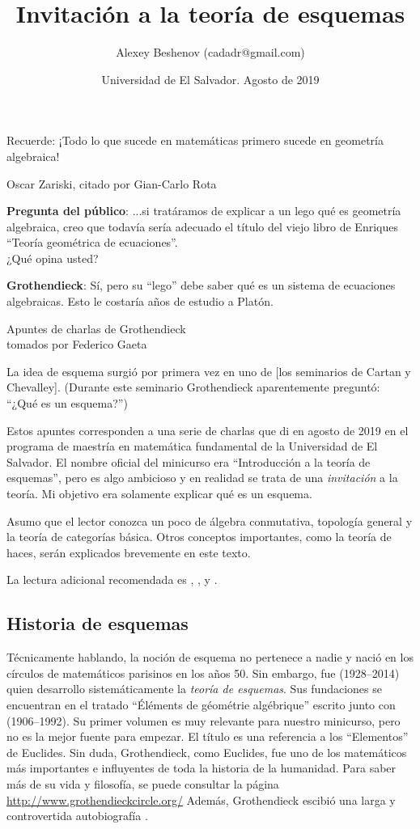 \documentclass{article}
\author{Alexey Beshenov (cadadr@gmail.com)}
\title{Invitación a la teoría de esquemas}
\date{Universidad de El Salvador. Agosto de 2019}
\numberwithin{equation}{section}
\theoremstyle{definition}
\begin{document}
{\normalfont\sffamily\bfseries \maketitle}

\epigraph{Recuerde: ¡Todo lo que sucede en matemáticas primero sucede
  en geometría algebraica!}{Oscar Zariski, citado por Gian-Carlo Rota}

\epigraph{\textbf{Pregunta del público}: ...si tratáramos de explicar a un lego
  qué es geometría algebraica, creo que todavía sería adecuado el título
  del viejo libro de Enriques ``Teoría geométrica de ecuaciones''.\\
  ¿Qué opina usted?

  \textbf{Grothendieck}: Sí, pero su ``lego'' debe saber qué es un sistema de
  ecuaciones algebraicas. Esto le costaría años de estudio a Platón.}{Apuntes de
  charlas de Grothendieck\\
  tomados por Federico Gaeta}

\epigraph{La idea de esquema surgió por primera vez en uno de
  [los seminarios de Cartan y Chevalley]. (Durante este seminario Grothendieck
  aparentemente preguntó: ``¿Qué es un esquema?'')}{\cite[Chapter
  6]{Scharlau-Spirituality}}

Estos apuntes corresponden a una serie de charlas que di en agosto de 2019 en
el programa de maestría en matemática fundamental de la Universidad de
El Salvador. El nombre oficial del minicurso era ``Introducción a la teoría
de esquemas'', pero es algo ambicioso y en realidad se trata de una
\emph{invitación} a la teoría. Mi objetivo era solamente explicar qué es
un esquema.

Asumo que el lector conozca un poco de álgebra conmutativa, topología general
y la teoría de categorías básica. Otros conceptos importantes, como la teoría
de haces, serán explicados brevemente en este texto.

La lectura adicional recomendada es \cite[Chapter I, II, VI]{Eisenbud-Harris},
\cite[Chapter 1--4]{Gortz-Wedhorn}, \cite[Chapter 5]{Shafarevich-BAG-2} y
\cite{Manin-Schemes}.

\subsection*{Historia de esquemas}

Técnicamente hablando, la noción de esquema no pertenece a nadie y nació en
los círculos de matemáticos parisinos en los años 50. Sin embargo,
fue  (1928--2014) quien desarrollo
sistemáticamente la \emph{teoría de esquemas}. Sus fundaciones se encuentran
en el tratado ``Éléments de géométrie algébrique'' escrito junto con
 (1906--1992). Su primer volumen \cite{EGAI-new}
es muy relevante para nuestro minicurso, pero no es la mejor fuente para
empezar. El título es una referencia a los ``Elementos'' de Euclides. Sin duda,
Grothendieck, como Euclides, fue uno de los matemáticos más importantes
e influyentes de toda la historia de la humanidad. Para saber más de su vida
y filosofía, se puede consultar la página
\url{http://www.grothendieckcircle.org/} Además, Grothendieck escibió una larga
y controvertida autobiografía \cite{ReS}.
\end{document}
